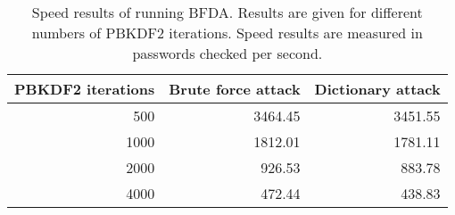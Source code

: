 \begin{table}[!h]
    \centering
    \caption{Speed results of running \ac{BFDA}. Results are given for different numbers of \ac{PBKDF2} iterations.
    Speed results are measured in passwords checked per second.}
    \label{tab:res_bf}
    \begin{tabular}{| r | r | r |}
	\hline
	\ac{PBKDF2} iterations           &Brute force attack	    &Dictionary attack\\
	\hline
	500		            &3464.45		    &3451.55\\
	\hline
	1000			    &1812.01		    &1781.11\\
	\hline
	2000		            &926.53		    &883.78\\
	\hline
	4000		            &472.44		    &438.83\\
	\hline
    \end{tabular}
\end{table}
